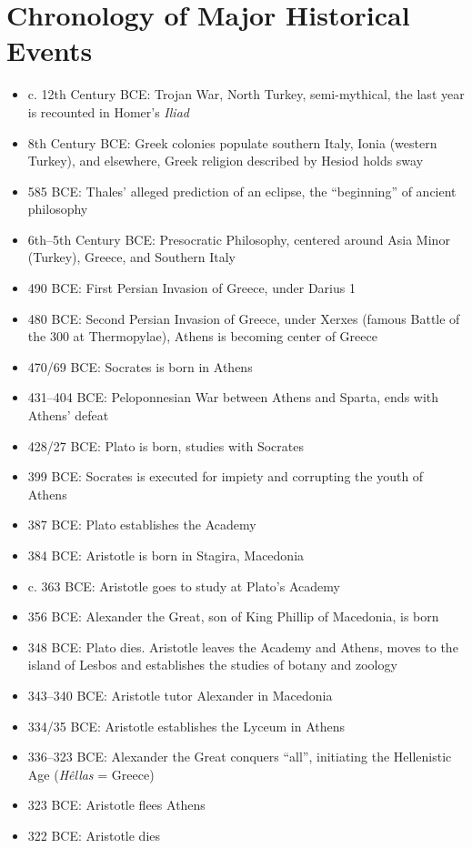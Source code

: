 \documentclass[oneside]{article}
\begin{document}
\section*{Chronology of Major Historical Events}
\begin{itemize}
\item{c. 12th Century BCE: Trojan War, North Turkey,  semi-mythical, the last year is recounted in Homer's \emph{Iliad}}
\item{8th Century BCE: Greek colonies populate southern Italy, Ionia (western Turkey), and elsewhere, Greek religion described by Hesiod holds sway}
\item 585 BCE: Thales' alleged prediction of an eclipse, the ``beginning'' of ancient philosophy
\item{6th--5th Century BCE: Presocratic Philosophy, centered around Asia Minor (Turkey), Greece, and Southern Italy}
\item{490 BCE: First Persian Invasion of Greece, under Darius 1}
\item{480 BCE: Second Persian Invasion of Greece, under Xerxes (famous Battle of the 300 at Thermopylae), Athens is becoming center of Greece}
\item{470/69 BCE: Socrates is born in Athens}
\item{431--404 BCE: Peloponnesian War between Athens and Sparta, ends with Athens' defeat}
\item{428/27 BCE: Plato is born, studies with Socrates}
\item{399 BCE: Socrates is executed for impiety and corrupting the youth of Athens}
\item{387 BCE: Plato establishes the Academy}

\item{384 BCE: Aristotle is born in Stagira, Macedonia}
\item{c. 363 BCE: Aristotle goes to study at Plato's Academy}
\item{356 BCE: Alexander the Great, son of King Phillip of Macedonia, is born}
\item{348 BCE: Plato dies. Aristotle leaves the Academy and Athens, moves to the island of Lesbos and establishes the studies of botany and zoology}
\item{343--340 BCE: Aristotle tutor Alexander in Macedonia}
\item{334/35 BCE: Aristotle establishes the Lyceum in Athens}
\item{336--323 BCE: Alexander the Great conquers ``all'', initiating the Hellenistic Age (\emph{H\^{e}llas} = Greece)}
\item{323 BCE: Aristotle flees Athens }
\item{322 BCE: Aristotle dies}


\end{itemize}
\end{document}

